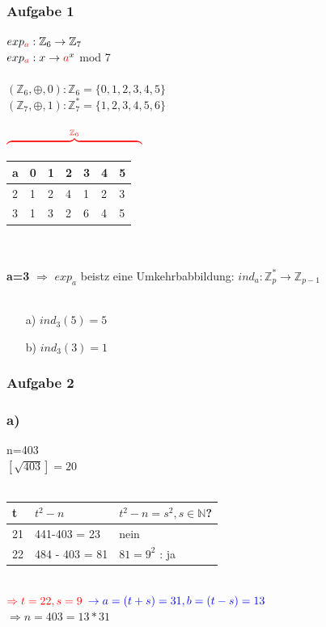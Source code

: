 \documentclass[10pt]{article}
\newcommand{\NN}{\mathbb{N}} %
\newcommand{\ZN}{\mathbb{Z}} %
\newcommand{\Bold}[1]{\textbf{#1}} %
\newcommand{\ra}{\rightarrow}
\newcommand{\Ra}{\Rightarrow}
\begin{document}
\subsubsection*{Aufgabe 1}
$exp_{\color{red}a} : \ZN_6 \ra \ZN_7$ \\
$exp_{\color{red}a} : x \ra {\color{red}a}^x$ mod 7 \\
\\
$(\ZN_6,\oplus,0): \ZN_6 = \{0,1,2,3,4,5\}$\\
$(\ZN_7,\oplus,1): \ZN^*_7 = \{1,2,3,4,5,6\}$\\
\\
${\color{red}\overbrace{\hspace{4.2cm}}^{\ZN_6}}$\\
\begin{tabular}{| l | l | l | l | l | l | l |}
	\hline
	a & 0 & 1 & 2 & 3 & 4 & 5 \\
	\hline
	2 & 1 & 2 & 4 & 1 & 2 & 3 \\
	\hline
	3 & 1 & 3 & 2 & 6 & 4 & 5 \\
	\hline
\end{tabular} \\
\\
\Bold{a=3} $\Ra$ $exp_a$ beistz eine Umkehrbabbildung: $ind_a : \ZN^*_p \ra \ZN_{p-1}$ \\
\\
\begin{itemize}
	\item[a)] $ind_3(5)=5$ 
	\item[b)] $ind_3(3)=1$
\end{itemize}

\subsubsection*{Aufgabe 2}
\subsubsection*{a)}
n=403 \\
$[\sqrt{403}]=20$ \\ \\
\begin{tabular}{l | l | l}
	t & $t^2-n$ & $t^2-n=s^2, s \in \NN$?  \\
	\hline
	21 & 441-403 = 23 & nein \\
	22 & 484 - 403 = 81 & $81=9^2$ : ja
\end{tabular} \\
${\color{red}\Ra t=22, s=9}$ ${\color{blue}\ra a=(t+s)=31, b=(t-s)=13}$\\
$\Ra n= 403=13*31$  
\end{document}

